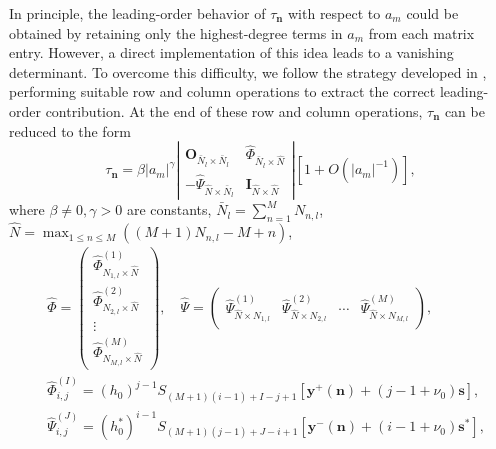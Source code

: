 \documentclass[preprint,3p,10pt]{elsarticle}
\theoremstyle{definition}
\begin{document}
In principle, the leading-order behavior of $\tau_{\mathbf{n}}$ with respect to $a_m$ could be obtained by retaining only the highest-degree terms in $a_m$ from each matrix entry. However, a direct implementation of this idea leads to a vanishing determinant. To overcome this difficulty, we follow the strategy developed in \cite{yang2023rogue,zhang2022rogue,lin2024rogue}, performing suitable row and column operations to extract the correct leading-order contribution.
At the end of these row and column operations, $\tau_{\mathbf{n}}$ can be reduced to
the form
	\begin{equation}\label{rewrite form}
		\tau_{\mathbf{n}}=\beta \left|a_m\right|^{\gamma}\left|\begin{array}{cc}
			\mathbf{O}_{\bar{N}_l\times \bar{N}_l} & \widehat{\Phi}_{\bar{N}_l \times \widehat{N}} \\
			-\widehat{\Psi}_{\widehat{N} \times \bar{N}_l} & \mathbf{I}_{\widehat{N} \times \widehat{N}}
		\end{array}\right|\left[1+O\left(|a_m|^{-1}\right)\right],
	\end{equation}
where $\beta \not = 0, \gamma>0$  are constants, $\bar{N}_l=\displaystyle{\sum_{n=1}^M}N_{n,l}$,  $\displaystyle{\widehat{N}=\max_{1\leq n \leq M}\left((M+1)N_{n,l}-M + n\right)}$,
	\begin{equation}
	\begin{aligned}
		&\widehat{\Phi}=\left(\begin{array}{llll}
			\widehat{\Phi}_{N_{1,l} \times \widehat{N}}^{(1)} \\
			\widehat{\Phi}_{N_{2,l} \times \widehat{N}}^{(2)}\\
			\vdots \\
			\widehat{\Phi}_{N_{M,l} \times \widehat{N}}^{(M)}
		\end{array}\right), \quad \widehat{\Psi}=\left(\begin{array}{llll}
			\widehat{\Psi}_{\widehat{N} \times N_{1,l}}^{(1)} & \widehat{\Psi}_{\widehat{N} \times N_{2,l}}^{(2)} &
			\cdots&
			\widehat{\Psi}_{\widehat{N} \times N_{M,l}}^{(M)}
		\end{array}\right),
\\
		&\widehat{\Phi}_{i, j}^{(I)}=\left(h_0\right)^{j-1} S_{(M+1)(i-1)+I-j+1}\left[\mathbf{y}^{+}(\mathbf{n})+\left(j-1+\nu_0\right) \mathbf{s}\right],
 \\
		&\widehat{\Psi}_{i, j}^{(J)}=\left(h_0^*\right)^{i-1} S_{(M+1)(j-1)+J-i+1}\left[\mathbf{y}^{-}(\mathbf{n})+\left(i-1+\nu_0\right) \mathbf{s}^*\right],
\end{aligned}
\end{equation}
\end{document}
